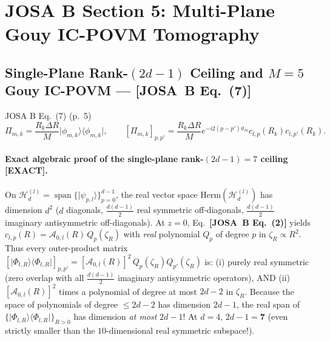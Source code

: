 \documentclass[10pt,letterpaper]{article}
\newcommand{\ket}[1]{\lvert #1 \rangle}
\newcommand{\bra}[1]{\langle #1 \rvert}
\newcommand{\josb}[1]{\textbf{[JOSA~B Eq.~(#1)]}}
\newcommand{\tagexact}{\textcolor{forest}{\textbf{[EXACT]}}}
\numberwithin{equation}{section}
\begin{document}
\section{JOSA B Section 5: Multi-Plane Gouy IC-POVM Tomography}
\label{sec:v2_b5}

\subsection{Single-Plane Rank-$(2d-1)$ Ceiling and $M=5$ Gouy IC-POVM --- \josb{7}}

\begin{targeteq}{JOSA B Eq.~(7) (p.~5)}
\[
  \Pi_{m,k} = \frac{R_k\Delta R}{M}\ket{\phi_{m,k}}\bra{\phi_{m,k}}, \qquad [\Pi_{m,k}]_{p,p'} = \frac{R_k\Delta R}{M} e^{-i 2(p-p')\vartheta_m} c_{l,p}(R_k) c_{l,p'}(R_k).
\]
\end{targeteq}

\paragraph*{Exact algebraic proof of the single-plane rank-$(2d-1) = 7$ ceiling \tagexact{}.}
On $\mathcal{H}_d^{(l)} = \operatorname{span}\{\ket{\psi_{p,l}}\}_{p=0}^{d-1}$, the real vector space $\mathrm{Herm}(\mathcal{H}_d^{(l)})$ has dimension $d^2$ ($d$ diagonals, $\frac{d(d-1)}{2}$ real symmetric off-diagonals, $\frac{d(d-1)}{2}$ imaginary antisymmetric off-diagonals). At $z = 0$, Eq.~\josb{2} yields $c_{l,p}(R) = \mathcal{A}_{0,l}(R)\,Q_p(\zeta_R)$ with \emph{real} polynomial $Q_p$ of degree $p$ in $\zeta_R \propto R^2$. Thus every outer-product matrix $[\ket{\Phi_{l,R}}\bra{\Phi_{l,R}}]_{p,p'} = [\mathcal{A}_{0,l}(R)]^2\,Q_p(\zeta_R) Q_{p'}(\zeta_R)$ is:
(i) purely real symmetric (zero overlap with all $\frac{d(d-1)}{2}$ imaginary antisymmetric operators), AND
(ii) $[\mathcal{A}_{0,l}(R)]^2$ times a polynomial of degree at most $2d - 2$ in $\zeta_R$.
Because the space of polynomials of degree $\le 2d-2$ has dimension $2d - 1$, the real span of $\{\ket{\Phi_{l,R}}\bra{\Phi_{l,R}}\}_{R>0}$ has dimension \emph{at most} $2d - 1$! At $d = 4$, $2d - 1 = \mathbf{7}$ (even strictly smaller than the $10$-dimensional real symmetric subspace!).
\end{document}
